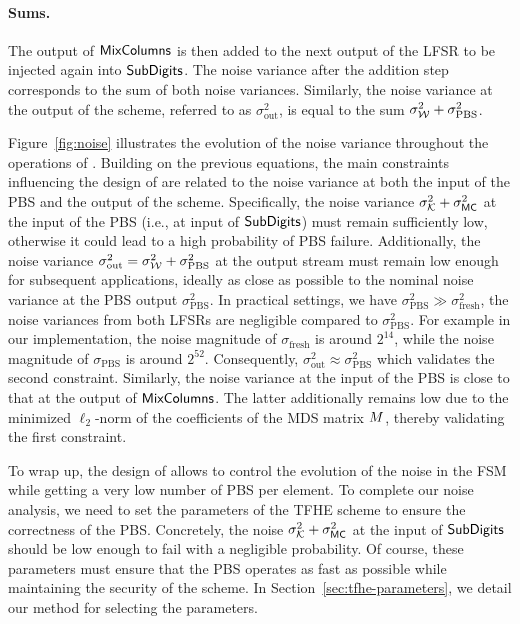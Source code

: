 \paragraph{Sums.} The output of $\text{\textsf{MixColumns}}$ is then added to the next output of the LFSR to be injected again into $\text{\textsf{SubDigits}}$. The noise variance after the addition step corresponds to the sum of both noise variances. Similarly, the noise variance at the output of the scheme, referred to as $\sigma^2_{\text{out}}$, is equal to the sum $\sigma_{\mathcal{W}}^2 + \sigma_{\text{PBS}}^2$.

%


Figure~\ref{fig:noise} illustrates the evolution of the noise variance throughout the operations of \coolName.
Building on the previous equations, the main constraints influencing the design of \coolName are related to the noise variance at both the input of the PBS and the output of the scheme. Specifically, the noise variance $\sigma_{\mathcal{K}}^2+\sigma^2_{\text{\textsf{MC}}}$ at the input of the PBS (i.e., at input of $\text{\textsf{SubDigits}}$) must remain sufficiently low, otherwise it could lead to a high probability of PBS failure. Additionally, the noise variance $\sigma^2_{\text{out}}  = \sigma_{\mathcal{W}}^2 + \sigma_{\text{PBS}}^2$ at the output stream must remain low enough for subsequent applications, ideally as close as possible to the nominal noise variance at the PBS output $\sigma_{\text{PBS}}^2$. In practical settings, we have $\sigma_{\text{PBS}}^2 \gg \sigma_{\text{fresh}}^2$, the noise variances from both LFSRs are negligible compared to $\sigma_{\text{PBS}}^2$. For example in our implementation, the noise magnitude of $\sigma_{\text{fresh}}$ is around $2^{14}$, while the noise magnitude of $\sigma_{\text{PBS}}$ is around $2^{52}$. Consequently, $\sigma^2_{\text{out}} \approx \sigma_{\text{PBS}}^2$ which validates the second constraint. Similarly, the noise variance at the input of the PBS is close to that at the output of $\text{\textsf{MixColumns}}$. The latter additionally remains low due to the minimized $\ell_2$-norm of the coefficients of the MDS matrix $M$, thereby validating the first constraint.


To wrap up, the design of \coolName{} allows to control the evolution of the noise in the FSM while getting a very low number of PBS per element. To complete our noise analysis, we need to set the parameters of the TFHE scheme to ensure the correctness of the PBS. Concretely, the noise \( \sigma_{\mathcal{K}}^2 + \sigma^2_{\text{\textsf{MC}}} \) at the input of \( \text{\textsf{SubDigits}} \) should be low enough to fail with a negligible probability. Of course, these parameters must ensure that the PBS operates as fast as possible while maintaining the security of the scheme. In Section~\ref{sec:tfhe-parameters}, we detail our method for selecting the parameters.








